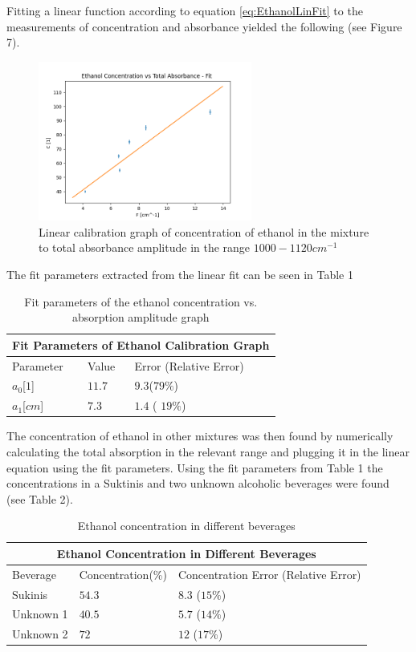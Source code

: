 \documentclass[reprint,amsmath,amssymb,aps, prl]{revtex4-2}
\begin{document}
Fitting a linear function according to equation \ref{eq:EthanolLinFit} to the measurements of concentration and absorbance yielded the following (see Figure 7).
    \begin{figure}[h]
    \includegraphics[width=7cm]{Images/linear_fittingethanol}
    \caption{Linear calibration graph of concentration of ethanol in the mixture to total absorbance amplitude in the range $1000-1120 cm^{-1}$}
    \label{fig:EthanolCalibration}
    \centering
\end{figure}
The fit parameters extracted from the linear fit can be seen in Table 1
\begin{table}[h]
\begin{tabular}{ |p{2cm}||p{2cm}|p{2cm}|  }
 \hline
 \multicolumn{3}{|c|}{Fit Parameters of Ethanol Calibration Graph} \\ \hline
 Parameter& Value &Error (Relative Error)\\ \hline
 $a_{0}$[$1$]    &$11.7$    &$9.3$($79\%$) \\
 $a_{1}$[$cm$] &$7.3$    & $1.4$ ( $19\%$)  \\ \hline
\end{tabular}
\caption{Fit parameters of the ethanol concentration vs. absorption amplitude graph}
\label{ethanol table}
\end{table}
The concentration of ethanol
in other mixtures was then found by numerically calculating the total absorption in the relevant range and plugging it in the linear equation using the fit parameters. Using the fit parameters from Table 1 the concentrations in a Suktinis and two unknown alcoholic beverages were found (see Table 2).

\begin{table}[h]
\begin{tabular}{ |p{2.8cm}|p{2.8cm}|p{2.8cm}|  }
 \hline
 \multicolumn{3}{|c|}{Ethanol Concentration in Different Beverages} \\
 \hline
 Beverage& Concentration(\%) &Concentration Error (Relative Error) \\ \hline
 Sukinis    &$54.3$   &$8.3$ ($15\%$) \\
 Unknown 1  &$40.5$   &$5.7$ ($14\%$) \\
 Unknown 2  &$72$     & $12$ ($17\%$) \\ \hline
\end{tabular}
\caption{Ethanol concentration in different beverages}
\label{beverages table}
\end{table}
\end{document}
